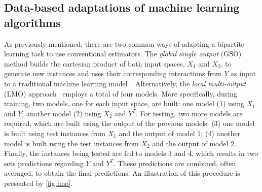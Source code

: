 \documentclass[sn-mathphys-num]{sn-jnl}%
\theoremstyle{thmstyleone}%
\theoremstyle{thmstyletwo}%
\theoremstyle{thmstylethree}%
\begin{document}
 

\subsection{Data-based adaptations of machine learning algorithms}
\label{sec:data-based}

As previously mentioned, there are two common ways of adapting a bipartite learning task to use conventional estimators.
The \textit{global single output} (GSO) method builds the cartesian product of both input spaces, $X_1$ and $X_2$, to generate new instances and uses their corresponding interactions from $Y$ as input to a traditional machine learning model~\cite{schrynemackers_classifying_2015,pliakos_global_2018}.
%
Alternatively, the \textit{local multi-output} (LMO) approach~\cite{schrynemackers_classifying_2015,pliakos_global_2018}
employs a total of four models. More specifically, during training, two models, one for each input space, are built: one model (1) using $X_1$ and $Y$; another model (2) using $X_2$ and $Y^T$. For testing, two more models are required, which are built using the output of the previous models: (3) one model is built using test instances from $X_1$ and the output of model 1; (4) another model is built using the test instances from $X_2$ and the output of model 2. Finally, the instances being tested are fed to models 3 and 4, which results in two sets predictions regarding $Y$ and $Y^T$. These predictions are combined, often averaged, to obtain the final predictions. An illustration of this procedure is presented by \autoref{fig:lmo}.
\end{document}
